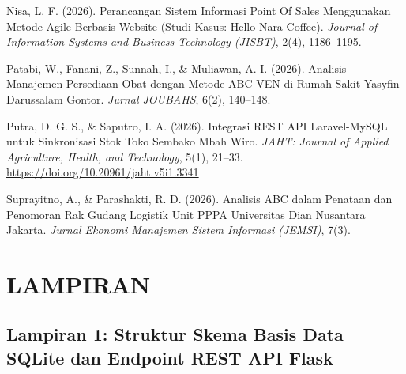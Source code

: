 \documentclass[11pt, a4paper]{article}
\begin{document}
\vspace{0.25cm}
\noindent\hangindent=0.75cm Nisa, L. F. (2026). Perancangan Sistem Informasi Point Of Sales Menggunakan Metode Agile Berbasis Website (Studi Kasus: Hello Nara Coffee). \textit{Journal of Information Systems and Business Technology (JISBT)}, 2(4), 1186--1195.

\vspace{0.25cm}
\noindent\hangindent=0.75cm Patabi, W., Fanani, Z., Sunnah, I., \& Muliawan, A. I. (2026). Analisis Manajemen Persediaan Obat dengan Metode ABC-VEN di Rumah Sakit Yasyfin Darussalam Gontor. \textit{Jurnal JOUBAHS}, 6(2), 140--148.

\vspace{0.25cm}
\noindent\hangindent=0.75cm Putra, D. G. S., \& Saputro, I. A. (2026). Integrasi REST API Laravel-MySQL untuk Sinkronisasi Stok Toko Sembako Mbah Wiro. \textit{JAHT: Journal of Applied Agriculture, Health, and Technology}, 5(1), 21--33. \url{https://doi.org/10.20961/jaht.v5i1.3341}

\vspace{0.25cm}
\noindent\hangindent=0.75cm Suprayitno, A., \& Parashakti, R. D. (2026). Analisis ABC dalam Penataan dan Penomoran Rak Gudang Logistik Unit PPPA Universitas Dian Nusantara Jakarta. \textit{Jurnal Ekonomi Manajemen Sistem Informasi (JEMSI)}, 7(3).

\newpage
\section*{LAMPIRAN}

\subsection*{Lampiran 1: Struktur Skema Basis Data SQLite dan Endpoint REST API Flask}
\end{document}
